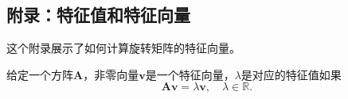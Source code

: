 
\appendix
\renewcommand{\thetable}{A.\arabic{table}} %
\renewcommand{\theequation}{A.\arabic{equation}} %


\begin{CJK}{UTF8}{gkai}
    \chapter*{附录：特征值和特征向量}
\end{CJK}

这个附录展示了如何计算旋转矩阵的特征向量。

给定一个方阵$\mathbf{A}$，非零向量$\mathbf{v}$是一个特征向量，$\lambda$是对应的特征值如果
$$
\mathbf{A v}=\lambda \mathbf{v}, \quad \lambda \in \mathbb{R} .
$$

